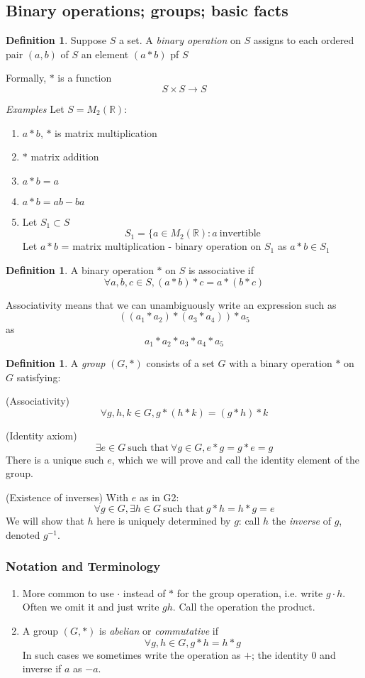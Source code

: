 \documentclass{report}
\makeatletter
\theoremstyle{remark}
\theoremstyle{definition}
\newtheorem{definition}[theorem]{Definition}
\theoremstyle{definition}
\theoremstyle{theorem}
\providecommand{\varitem}{} %
\newenvironment{axioms}[1]
 {\renewcommand\varitem[1]{\item[\textbf{#1\arabic{enumi}\rlap{$##1$}.}]%
    \edef\@currentlabel{#1\arabic{enumi}{$##1$}}}%
  \enumerate[label=\textbf{#1\arabic*.}, ref=#1\arabic*]}
 {\endenumerate}
\makeatother
\begin{document}
\subsection{Binary operations; groups; basic facts}
\begin{definition}
Suppose $S$ a set. A \emph{binary operation} on $S$ assigns to each ordered pair $(a,b)$ of $S$ an element $(a*b)$ pf $S$\par
Formally, $*$ is a function
\[S \times S \rightarrow S\]
\end{definition}
\emph{Examples}
Let $S=M_2(\mathbb{R})$:
\begin{enumerate}[label=\arabic*)]
    \item $a*b$, $*$ is matrix multiplication
    \item $*$ matrix addition
    \item $a*b=a$
    \item $a*b=ab-ba$
    \item Let $S_1 \subset S$
    \[S_1=\{a \in M_2(\mathbb{R}):a \> \text{invertible}\]
    Let $a*b$ = matrix multiplication - binary operation on $S_1$ as $a*b \in S_1$
\end{enumerate}
\begin{definition}
A binary operation $*$ on $S$ is associative if
\[\forall a,b,c \in S, (a*b)*c=a*(b*c)\]
\end{definition}
Associativity means that we can unambiguously write an expression such as
\[((a_1*a_2)*(a_3*a_4))*a_5\]
as
\[a_1*a_2*a_3*a_4*a_5\]
\begin{definition}
A \emph{group} $(G,*)$ consists of a set $G$ with a binary operation $*$ on $G$ satisfying:
\begin{axioms}{G}
    \item (Associativity)
    \[\forall g,h,k\in G, g*(h*k)=(g*h)*k\]
    \item (Identity axiom)
    \[\exists e \in G \> \text{such that} \> \forall g \in G, e*g=g*e=g\]
    There is a unique such $e$, which we will prove and call the identity element of the group.
    \item (Existence of inverses) With $e$ as in G2:
    \[\forall g \in G, \exists h \in G \> \text{such that} \> g*h=h*g=e\]
    We will show that $h$ here is uniquely determined by $g$: call $h$ the \emph{inverse} of $g$, denoted $g^{-1}$.
\end{axioms}
\end{definition}
\setcounter{subsubsection}{3}
\subsubsection{Notation and Terminology}
\begin{enumerate}[label=\textcircled{\tiny{\arabic*}}]
    \item More common to use $\cdot$ instead of $*$ for the group operation, i.e. write $g\cdot h$. Often we omit it and just write $gh$. Call the operation the product.
    \item A group $(G,*)$ is \emph{abelian} or \emph{commutative} if
    \[\forall g,h \in G, g*h=h*g\]
    In such cases we sometimes write the operation as $+$; the identity 0 and inverse if $a$ as $-a$.
\end{enumerate}
\end{document}
